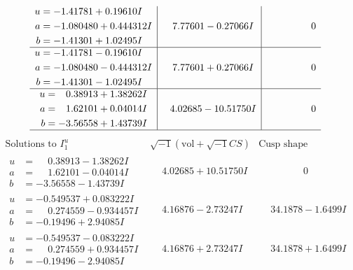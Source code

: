 \documentclass[1p]{elsarticle_modified}
\theoremstyle{definition}
\newcommand{\I}{\sqrt{-1}}
\begin{document}
$$\begin{array}{c|c|c}
\begin{aligned}
u &= -1.41781 + 0.19610 I \\
a &= -1.080480 + 0.444312 I \\
b &= -1.41301 + 1.02495 I\end{aligned}
 & \phantom{-}7.77601 - 0.27066 I & \phantom{-0.000000 } 0 \\ \hline\begin{aligned}
u &= -1.41781 - 0.19610 I \\
a &= -1.080480 - 0.444312 I \\
b &= -1.41301 - 1.02495 I\end{aligned}
 & \phantom{-}7.77601 + 0.27066 I & \phantom{-0.000000 } 0 \\ \hline\begin{aligned}
u &= \phantom{-}0.38913 + 1.38262 I \\
a &= \phantom{-}1.62101 + 0.04014 I \\
b &= -3.56558 + 1.43739 I\end{aligned}
 & \phantom{-}4.02685 - 10.51750 I & \phantom{-0.000000 } 0\\
 \hline 
 \end{array}$$\newpage$$\begin{array}{c|c|c}  
\text{Solutions to }I^u_{1}& \I (\text{vol} + \sqrt{-1}CS) & \text{Cusp shape}\\
 \hline 
\begin{aligned}
u &= \phantom{-}0.38913 - 1.38262 I \\
a &= \phantom{-}1.62101 - 0.04014 I \\
b &= -3.56558 - 1.43739 I\end{aligned}
 & \phantom{-}4.02685 + 10.51750 I & \phantom{-0.000000 } 0 \\ \hline\begin{aligned}
u &= -0.549537 + 0.083222 I \\
a &= \phantom{-}0.274559 - 0.934457 I \\
b &= -0.19496 + 2.94085 I\end{aligned}
 & \phantom{-}4.16876 - 2.73247 I & \phantom{-}34.1878 - 1.6499 I \\ \hline\begin{aligned}
u &= -0.549537 - 0.083222 I \\
a &= \phantom{-}0.274559 + 0.934457 I \\
b &= -0.19496 - 2.94085 I\end{aligned}
 & \phantom{-}4.16876 + 2.73247 I & \phantom{-}34.1878 + 1.6499 I \\ \hline\begin{aligned}

\end{aligned}
\end{array}$$
\end{document}
